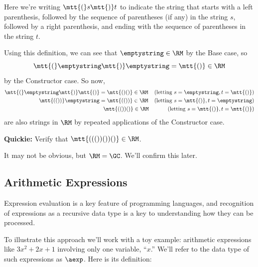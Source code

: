 Here we're writing $\mtt{(}s\mtt{)}t$ to indicate the string that
starts with a left parenthesis, followed by the sequence of parentheses
(if any) in the string $s$, followed by a right parenthesis, and ending
with the sequence of parentheses in the string $t$.

Using this definition, we can see that $\emptystring \in\RM$ by the Base
case, so
\[
\mtt{(}\emptystring\mtt{)}\emptystring=\mtt{()}\in\RM
\]
by the Constructor case.  So now,
\begin{align*}
\mtt{(}\emptystring\mtt{)}\mtt{()} &= \mtt{()()} \in \RM
    & \text{(letting $s = \emptystring, t = \mtt{()}$)}\\
\mtt{(())}\emptystring & = \mtt{(())} \in \RM
    & \text{(letting $s = \mtt{()}, t = \emptystring$)}\\
&\ \ \mtt{(())()} \in \RM
    & \text{(letting $s = \mtt{()}, t = \mtt{()}$)}
\end{align*}
are also strings in $\RM$ by repeated applications of the Constructor
case.

\textbf{Quickie:} Verify that $\mtt{((())())()} \in \RM$.

It may not be obvious, but $\RM = \GC$.  We'll confirm this later.

\subsection{Arithmetic Expressions}
Expression evaluation is a key feature of programming languages, and
recognition of expressions as a recursive data type is a key to
understanding how they can be processed.

To illustrate this approach we'll work with a toy example: arithmetic
expressions like $3x^2 + 2x + 1$ involving only one variable, ``$x$.''
We'll refer to the data type of such expressions as $\aexp$.  Here is its
definition:


